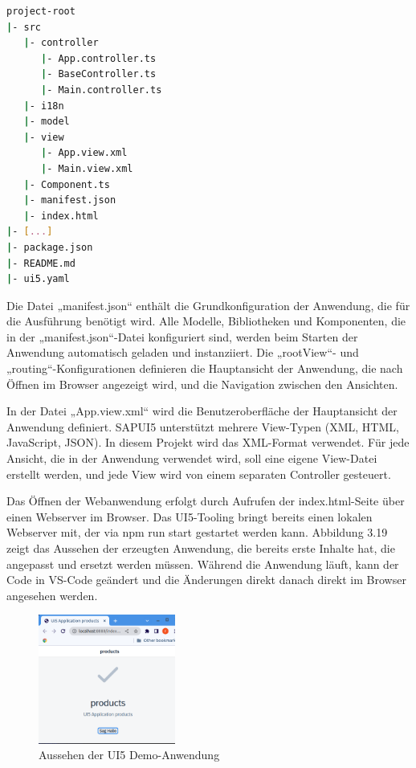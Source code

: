 \begin{lstlisting}[language=bash,  caption=Die grundlegende Projektstruktur eines SAPUI5-Projekts]
project-root
|- src
   |- controller
      |- App.controller.ts
      |- BaseController.ts
      |- Main.controller.ts
   |- i18n
   |- model
   |- view
      |- App.view.xml
      |- Main.view.xml
   |- Component.ts
   |- manifest.json
   |- index.html
|- [...]
|- package.json
|- README.md
|- ui5.yaml
\end{lstlisting}

Die Datei „manifest.json“ enthält die Grundkonfiguration der Anwendung, die für die Ausführung benötigt wird. Alle Modelle, Bibliotheken und Komponenten, die in der „manifest.json“-Datei konfiguriert sind, werden beim Starten der Anwendung automatisch geladen und instanziiert. Die „rootView“- und „routing“-Konfigurationen definieren die Hauptansicht der Anwendung, die nach Öffnen im Browser angezeigt wird, und die Navigation zwischen den Ansichten.

In der Datei „App.view.xml“ wird die Benutzeroberfläche der Hauptansicht der Anwendung definiert. SAPUI5 unterstützt mehrere View-Typen (XML, HTML, JavaScript, JSON). In diesem Projekt wird das XML-Format verwendet. Für jede Ansicht, die in der Anwendung verwendet wird, soll eine eigene View-Datei erstellt werden, und jede View wird von einem separaten Controller gesteuert. 

Das Öffnen der Webanwendung erfolgt durch Aufrufen der index.html-Seite   über einen Webserver im Browser.  Das UI5-Tooling bringt bereits einen lokalen Webserver mit, der via npm run start gestartet werden kann.  Abbildung 3.19 zeigt das Aussehen der erzeugten Anwendung, die bereits erste Inhalte hat, die angepasst und ersetzt werden müssen. Während die Anwendung läuft, kann der Code in VS-Code geändert und die Änderungen direkt danach direkt im Browser angesehen werden. 

\begin{figure}[htbp]
 \centering
 \includegraphics[width=0.4\textwidth]{Bilder/ui5 freestyle/3_19_ui5_demo.png}
 \caption{Aussehen der UI5 Demo-Anwendung}
\end{figure}

